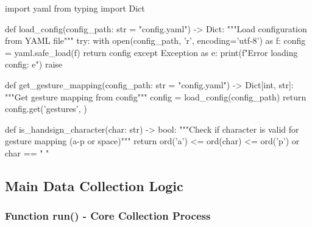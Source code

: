 \begin{aivncodebox}
\begin{python}
import yaml
from typing import Dict

def load_config(config_path: str = "config.yaml") -> Dict:
    """Load configuration from YAML file"""
    try:
        with open(config_path, 'r', encoding='utf-8') as f:
            config = yaml.safe_load(f)
        return config
    except Exception as e:
        print(f"Error loading config: {e}")
        raise

def get_gesture_mapping(config_path: str = "config.yaml") -> Dict[int, str]:
    """Get gesture mapping from config"""
    config = load_config(config_path)
    return config.get('gestures', {})

def is_handsign_character(char: str) -> bool:
    """Check if character is valid for gesture mapping (a-p or space)"""
    return ord('a') <= ord(char) <= ord('p') or char == " "
\end{python}
\end{aivncodebox}

\subsection{Main Data Collection Logic}

\subsubsection{Function run() - Core Collection Process}

